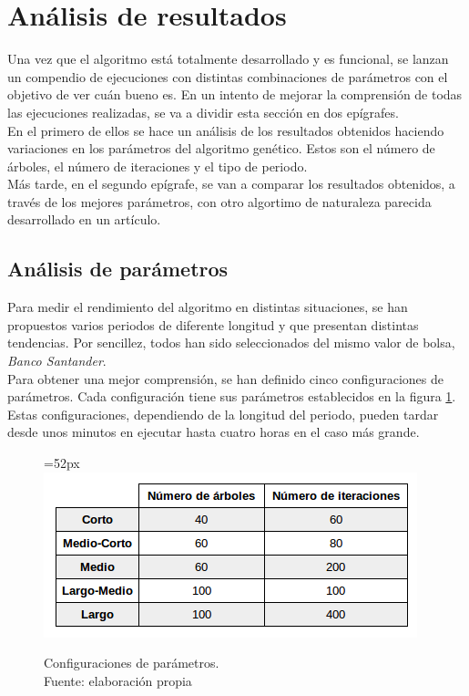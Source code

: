 \section{An\'alisis de resultados}\label{sec:analisis}
Una vez que el algoritmo est\'a totalmente desarrollado y es funcional, se lanzan un compendio de ejecuciones con distintas combinaciones de par\'ametros con el objetivo de ver cu\'an bueno es.
En un intento de mejorar la comprensi\'on de todas las ejecuciones realizadas, se va a dividir esta secci\'on en dos ep\'igrafes. \\

En el primero de ellos se hace un an\'alisis de los resultados obtenidos haciendo variaciones en los par\'ametros del algoritmo gen\'etico. Estos son el n\'umero de \'arboles, el n\'umero de iteraciones y el tipo de periodo.\\

M\'as tarde, en el segundo ep\'igrafe, se van a comparar los resultados obtenidos, a trav\'es de los mejores par\'ametros, con otro algortimo de naturaleza parecida desarrollado en un art\'iculo.\\


\subsection{An\'alisis de par\'ametros}

Para medir el rendimiento del algoritmo en distintas situaciones, se han propuestos varios periodos de diferente longitud y que presentan distintas tendencias. Por sencillez, todos han sido seleccionados del mismo valor de bolsa, \textit{Banco Santander}.\\

Para obtener una mejor comprensi\'on, se han definido cinco configuraciones de par\'ametros. Cada configuraci\'on tiene sus par\'ametros establecidos en la figura \ref{fig:params}. Estas configuraciones, dependiendo de la longitud del periodo, pueden tardar desde unos minutos en ejecutar hasta cuatro horas en el caso m\'as grande.\\

     	\begin{figure}[H]
     		\centering\leftskip=52px
     		\includegraphics[scale=0.65]{imagenes/params.png}
     		\caption[Configuraciones de par\'ametros]{Configuraciones de par\'ametros.\\ Fuente: elaboraci\'on propia}
     		\label{fig:params}
     	\end{figure}

